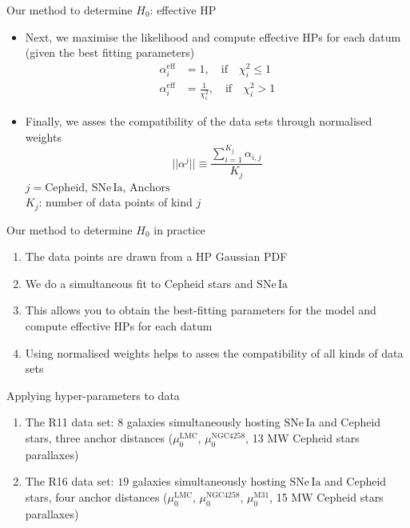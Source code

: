 \documentclass{beamer}
\newcommand{\eff}{\mathrm{eff}}
\newcommand{\LMC}{\mathrm{LMC}}
\newcommand{\MW}{\mathrm{MW}}
\newcommand{\Cepheid}{\mathrm{Cepheid}}
\newcommand{\Anchors}{\mathrm{Anchors}}
\newcommand{\SNe}{\mathrm{SNe\,Ia}}
\newcommand{\MAnd}{\mathrm{M31}}
\newcommand{\NGC}{\mathrm{NGC4258}}
\begin{document}
\begin{frame}{Our method to determine $H_0$: effective HP}
\begin{itemize}
\item Next, we maximise the likelihood and compute effective HPs for each datum (given the best fitting parameters)
\begin{eqnarray*}
\alpha^{\eff}_i & = 1,\quad \mathrm{if} \quad \chi^2_i\leq1
\\
\alpha^{\eff}_i & = \frac{1}{\chi^2_i},\quad \mathrm{if} \quad \chi^2_i> 1
\end{eqnarray*}
\item Finally, we asses the compatibility of the data sets through normalised weights
\begin{equation*}
|| \alpha^{j} || \equiv \frac{\sum_{i=1}^{K_j} \alpha_{i,j}}{K_j}
\label{Eq:normalised-weights}
\end{equation*}
$j=\Cepheid,\,\SNe,\,\Anchors$\\
$K_j$: number of data points of kind $j$ 
\end{itemize}

\end{frame}

\begin{frame}{Our method to determine $H_0$ in practice}
\begin{enumerate}
\item The data points are drawn from a HP Gaussian PDF
\item We do a simultaneous fit to Cepheid stars and $\SNe$
\item This allows you to obtain the best-fitting parameters for the model and compute effective HPs for each  datum
\item Using normalised  weights helps to asses the compatibility of all kinds of data sets  
\end{enumerate}
\end{frame}

\begin{frame}{Applying hyper-parameters to data}
\begin{enumerate}
\item The R11 data set: $8$ galaxies simultaneously hosting $\SNe$ and Cepheid stars, three anchor distances ($\mu_0^\LMC$, $\mu_0^\NGC$, 13 $\MW$ Cepheid stars parallaxes)
\item The R16 data set: $19$ galaxies simultaneously hosting $\SNe$ and Cepheid stars, four anchor distances ($\mu_0^\LMC$, $\mu_0^\NGC$, $\mu_0^\MAnd$, 15 $\MW$ Cepheid stars parallaxes)
\end{enumerate}
\end{frame}
\end{document}
